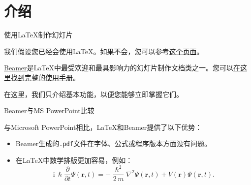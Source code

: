 \section{介绍}

\begin{frame}{使用\LaTeX 制作幻灯片}

	我们假设您已经会使用\LaTeX。如果不会，您可以参考\href{https://www.overleaf.com/learn/latex/Learn_LaTeX_in_30_minutes}{这个页面}。

	\href{https://www.overleaf.com/learn/latex/Beamer}{Beamer}是\LaTeX 中最受欢迎和最具影响力的幻灯片制作文档类之一。您可以\href{https://mirror-hk.koddos.net/CTAN/macros/latex/contrib/beamer/doc/beameruserguide.pdf}{在这里找到完整的使用手册}。

	在这里，我们只介绍基本功能，以便您能够立即掌握它们。
\end{frame}


\begin{frame}{Beamer与MS PowerPoint比较}

	与Microsoft PowerPoint相比，\LaTeX 和Beamer提供了以下优势：
	
	\begin{itemize}
		\item Beamer生成的\texttt{.pdf}文件在字体、公式或程序版本方面没有问题。
		\item 在\LaTeX 中数学排版更加容易，例如：
			\begin{equation*}
				\mathrm{i}\,\hslash\frac{\partial}{\partial t} \Psi(\mathbf{r},t) =
				-\frac{\hslash^2}{2\,m}\nabla^2\Psi(\mathbf{r},t)
				+ V(\mathbf{r})\Psi(\mathbf{r},t).
			\end{equation*}
	\end{itemize}
\end{frame}